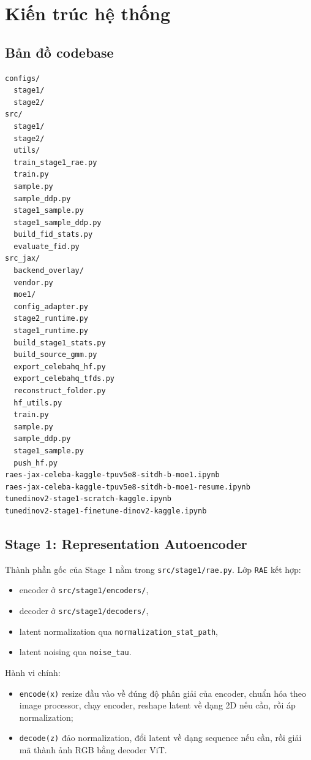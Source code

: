 \section{Kiến trúc hệ thống}

\subsection{Bản đồ codebase}

\begin{lstlisting}[style=rae]
configs/
  stage1/
  stage2/
src/
  stage1/
  stage2/
  utils/
  train_stage1_rae.py
  train.py
  sample.py
  sample_ddp.py
  stage1_sample.py
  stage1_sample_ddp.py
  build_fid_stats.py
  evaluate_fid.py
src_jax/
  backend_overlay/
  vendor.py
  moe1/
  config_adapter.py
  stage2_runtime.py
  stage1_runtime.py
  build_stage1_stats.py
  build_source_gmm.py
  export_celebahq_hf.py
  export_celebahq_tfds.py
  reconstruct_folder.py
  hf_utils.py
  train.py
  sample.py
  sample_ddp.py
  stage1_sample.py
  push_hf.py
raes-jax-celeba-kaggle-tpuv5e8-sitdh-b-moe1.ipynb
raes-jax-celeba-kaggle-tpuv5e8-sitdh-b-moe1-resume.ipynb
tunedinov2-stage1-scratch-kaggle.ipynb
tunedinov2-stage1-finetune-dinov2-kaggle.ipynb
\end{lstlisting}

\subsection{Stage 1: Representation Autoencoder}

Thành phần gốc của Stage 1 nằm trong \texttt{src/stage1/rae.py}. Lớp
\texttt{RAE} kết hợp:

\begin{itemize}[leftmargin=1.5em]
  \item encoder ở \texttt{src/stage1/encoders/},
  \item decoder ở \texttt{src/stage1/decoders/},
  \item latent normalization qua \texttt{normalization\_stat\_path},
  \item latent noising qua \texttt{noise\_tau}.
\end{itemize}

Hành vi chính:

\begin{itemize}[leftmargin=1.5em]
  \item \texttt{encode(x)} resize đầu vào về đúng độ phân giải của encoder,
  chuẩn hóa theo image processor, chạy encoder, reshape latent về dạng 2D nếu
  cần, rồi áp normalization;
 \item \texttt{decode(z)} đảo normalization, đổi latent về dạng sequence nếu
  cần, rồi giải mã thành ảnh RGB bằng decoder ViT.
\end{itemize}

